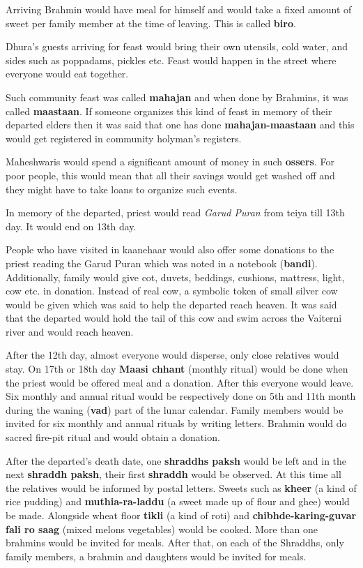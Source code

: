 Arriving Brahmin would have meal for himself and would take a fixed amount of
sweet per family member at the time of leaving. This is called \textbf{biro}.

Dhura's guests arriving for feast would bring their own utensils, cold water,
and sides such as poppadams, pickles etc. Feast would happen in the street
where everyone would eat together.

Such community feast was called \textbf{mahajan} and when done by Brahmins, it
was called \textbf{maastaan}. If someone organizes this kind of feast in memory
of their departed elders then it was said that one has done
\textbf{mahajan-maastaan} and this would get registered in community holyman's
registers.

Maheshwaris would spend a significant amount of money in such \textbf{ossers}.
For poor people, this would mean that all their savings would get washed off
and they might have to take loans to organize such events.

In memory of the departed, priest would read \textit{Garud Puran} from teiya
till 13th day. It would end on 13th day.

People who have visited in kaanehaar would also offer some donations to the
priest reading the Garud Puran which was noted in a notebook (\textbf{bandi}).
Additionally, family would give cot, duvets, beddings, cushions, mattress,
light, cow etc. in donation. Instead of real cow, a symbolic token of small
silver cow would be given which was said to help the departed reach heaven. It
was said that the departed would hold the tail of this cow and swim across the
Vaiterni river and would reach heaven.

After the 12th day, almost everyone would disperse, only close relatives would
stay. On 17th or 18th day \textbf{Maasi chhant} (monthly ritual) would be done
when the priest would be offered meal and a donation. After this everyone would
leave. Six monthly and annual ritual would be respectively done on 5th and 11th
month during the waning (\textbf{vad}) part of the lunar calendar. Family
members would be invited for six monthly and annual rituals by writing letters.
Brahmin would do sacred fire-pit ritual and would obtain a donation.

After the departed's death date, one \textbf{shraddhs paksh} would be left and
in the next \textbf{shraddh paksh}, their first \textbf{shraddh} would be
observed. At this time all the relatives would be informed by postal letters.
Sweets such as \textbf{kheer} (a kind of rice pudding) and
\textbf{muthia-ra-laddu} (a sweet made up of flour and ghee) would be made.
Alongside wheat floor \textbf{tikli} (a kind of roti) and
\textbf{chibhde-karing-guvar fali ro saag} (mixed melons vegetables) would be
cooked. More than one brahmins would be invited for meals. After that, on each
of the Shraddhs, only family members, a brahmin and daughters would be invited
for meals.

